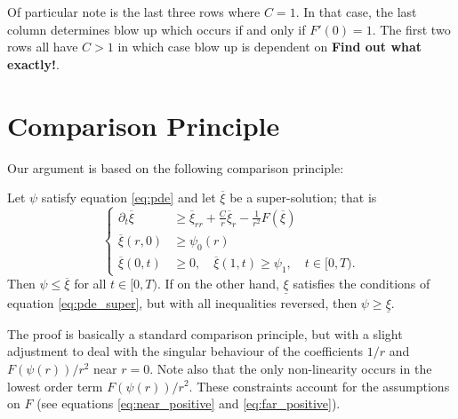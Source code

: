 \documentclass{amsart}
\begin{document}
Of particular note is the last three rows where \(C = 1\). In that case, the last column determines blow up which occurs if and only if \(F'(0) = 1\). The first two rows all have \(C > 1\) in which case blow up is dependent on \textbf{Find out what exactly!}.


\section{Comparison Principle}

Our argument is based on the following comparison principle:

\begin{thm}
Let \(\psi\) satisfy equation \eqref{eq:pde} and let \(\overline{\xi}\) be a super-solution; that is
\begin{equation}
\label{eq:pde_super}
\begin{cases}
\partial_t \overline{\xi} &\geq \overline{\xi}_{rr} + \frac{C}{r} \overline{\xi}_r - \frac{1}{r^2} F(\overline{\xi}) \\
\overline{\xi}(r, 0) &\geq \psi_0(r) \\
\overline{\xi}(0, t) &\geq 0, \quad \overline{\xi}(1, t) \geq \psi_1, \quad t \in [0, T).
\end{cases}
\end{equation}
Then \(\psi \leq \overline{\xi}\) for all \(t \in [0, T)\). If on the other hand, \(\underline{\xi}\) satisfies the conditions of equation \eqref{eq:pde_super}, but with all inequalities reversed, then \(\psi \geq \underline{\xi}\).
\end{thm}

The proof is basically a standard comparison principle, but with a slight adjustment to deal with the singular behaviour of the coefficients \(1/r\) and \(F(\psi(r))/r^2\) near \(r=0\). Note also that the only non-linearity occurs in the lowest order term \(F(\psi(r))/r^2\). These constraints account for the assumptions on \(F\) (see equations \eqref{eq:near_positive} and \eqref{eq:far_positive}).
\end{document}
